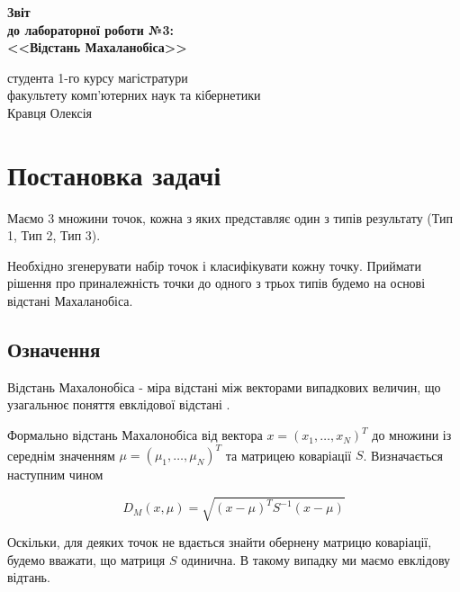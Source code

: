 \documentclass[a4paper,12pt]{article}
\begin{document}
	
	\begin{titlepage}
		\vspace*{6cm}
		\begin{center}
			
			\large
			\textbf{Звіт}\\
			\textbf{до лабораторної роботи №3:}\\
			\textbf{<<Відстань Махаланобіса>>}
			
		\end{center}
		
		\vspace{8cm}
		\begin{flushright}
			студента 1-го курсу магістратури\\
			факультету комп'ютерних наук та кібернетики\\
			Кравця Олексія
		\end{flushright}
		
	\end{titlepage}

\newpage
\tableofcontents
\newpage
\section{Постановка задачі}

Маємо 3 множини точок, кожна з яких представляє один з типів результату (Тип 1, Тип 2, Тип 3).

Необхідно згенерувати набір точок і класифікувати кожну точку. Приймати рішення про приналежність точки до одного з трьох типів будемо на основі відстані Махаланобіса.

\subsection{Означення}

Відстань Махалонобіса - міра відстані між векторами випадкових величин, що узагальнює поняття евклідової відстані \cite{Wiki}.

Формально відстань Махалонобіса від вектора $x= (x_1, \ldots, x_N)^T$ до множини із середнім значенням $\mu = (\mu_1, \ldots, \mu_N)^T$ та матрицею коваріації $S$. Визначається наступним чином

\begin{equation}
	D_M (x, \mu) = \sqrt{(x-\mu)^T S^{-1} (x-\mu)}
\end{equation}

Оскільки, для деяких точок не вдається знайти обернену матрицю коваріації, будемо вважати, що матриця $S$ одинична. В такому випадку ми маємо евклідову відтань.
\end{document}
